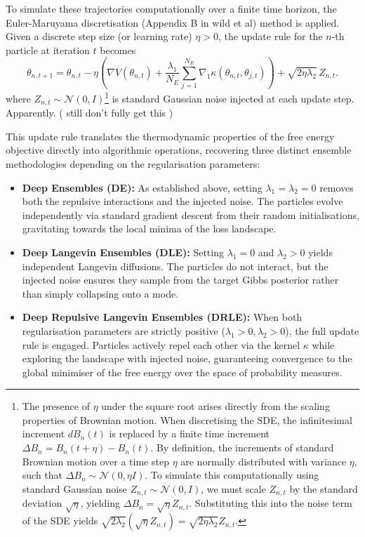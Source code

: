 \documentclass[11pt,a4paper]{article}
\begin{document}
To simulate these trajectories computationally over a finite time horizon, the Euler-Maruyama discretisation (Appendix B in wild et al) method is applied. Given a discrete step size (or learning rate) $\eta > 0$, the update rule for the $n$-th particle at iteration $t$ becomes
\begin{equation}
    \theta_{n, t+1} = \theta_{n, t} - \eta \left( \nabla V(\theta_{n, t}) + \frac{\lambda_1}{N_E} \sum_{j=1}^{N_E} \nabla_1 \kappa(\theta_{n, t}, \theta_{j, t}) \right) + \sqrt{2\eta\lambda_2} \, Z_{n, t}.
    \label{eq:updaterule}
\end{equation}
where $Z_{n, t} \sim \mathcal{N}(0, I)$\footnote{The presence of $\eta$ under the square root arises directly from the scaling properties of Brownian motion. When discretising the SDE, the infinitesimal increment $dB_n(t)$ is replaced by a finite time increment $\Delta B_n = B_n(t+\eta) - B_n(t)$. By definition, the increments of standard Brownian motion over a time step $\eta$ are normally distributed with variance $\eta$, such that $\Delta B_n \sim \mathcal{N}(0, \eta I)$. To simulate this computationally using standard Gaussian noise $Z_{n,t} \sim \mathcal{N}(0, I)$, we must scale $Z_{n,t}$ by the standard deviation $\sqrt{\eta}$, yielding $\Delta B_n = \sqrt{\eta}Z_{n,t}$. Substituting this into the noise term of the SDE yields $\sqrt{2\lambda_2}(\sqrt{\eta}Z_{n,t}) = \sqrt{2\eta\lambda_2}Z_{n,t}$.} is standard Gaussian noise injected at each update step. Apparently. ( still don't fully get this )

This update rule translates the thermodynamic properties of the free energy objective directly into algorithmic operations, recovering three distinct ensemble methodologies depending on the regularisation parameters:
\begin{itemize}
    \item \textbf{Deep Ensembles (DE):} As established above, setting $\lambda_1 = \lambda_2 = 0$ removes both the repulsive interactions and the injected noise. The particles evolve independently via standard gradient descent from their random initialisations, gravitating towards the local minima of the loss landscape.
    \item \textbf{Deep Langevin Ensembles (DLE):} Setting $\lambda_1 = 0$ and $\lambda_2 > 0$ yields independent Langevin diffusions. The particles do not interact, but the injected noise ensures they sample from the target Gibbs posterior rather than simply collapsing onto a mode.
    \item \textbf{Deep Repulsive Langevin Ensembles (DRLE):} When both regularisation parameters are strictly positive ($\lambda_1 > 0, \lambda_2 > 0$), the full update rule is engaged. Particles actively repel each other via the kernel $\kappa$ while exploring the landscape with injected noise, guaranteeing convergence to the global minimiser of the free energy over the space of probability measures.
\end{itemize}
\end{document}
